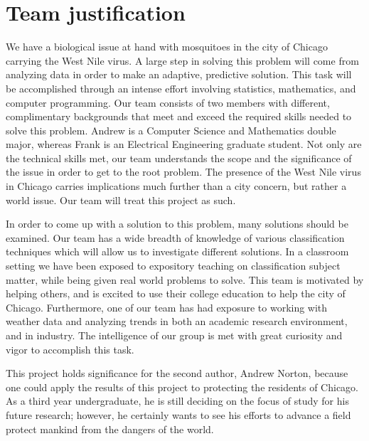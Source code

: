 \documentclass{article} %
\begin{document}
\section{Team justification}

We have a biological issue at hand with mosquitoes in the city of Chicago carrying the West Nile virus.  A large step in solving this problem will come from analyzing data in order to make an adaptive, predictive solution.  This task will be accomplished through an intense effort involving statistics, mathematics, and computer programming.  Our team consists of two members with different, complimentary backgrounds that meet and exceed the required skills needed to solve this problem.  Andrew is a Computer Science and Mathematics double major, whereas Frank is an Electrical Engineering graduate student. Not only are the technical skills met, our team understands the scope and the significance of the issue in order to get to the root problem.  The presence of the West Nile virus in Chicago carries implications much further than a city concern, but rather a world issue.  Our team will treat this project as such.  

In order to come up with a solution to this problem, many solutions should be examined.  Our team has a wide breadth of knowledge of various classification techniques which will allow us to investigate different solutions.  In a classroom setting we have been exposed to expository teaching on classification subject matter, while being given real world problems to solve.  This team is motivated by helping others, and is excited to use their college education to help the city of Chicago. Furthermore, one of our team has had exposure to working with weather data and analyzing trends in both an academic research environment, and in industry.   The intelligence of our group is met with great curiosity and vigor to accomplish this task.

This project holds significance for the second author, Andrew Norton, because one could apply the results of this project to protecting the residents of Chicago.  As a third year undergraduate, he is still deciding on the focus of study for his future research; however, he certainly wants to see his efforts to advance a field protect mankind from the dangers of the world.  
\end{document}
